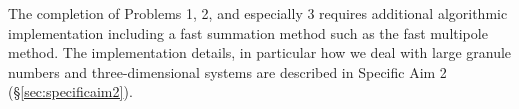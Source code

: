 The completion of Problems 1, 2, and especially 3 requires additional
algorithmic implementation including a fast summation method such as the
fast multipole method. The implementation details, in particular how we
deal with large granule numbers and three-dimensional systems are
described in Specific Aim 2 (\S\ref{sec:specificaim2}).




